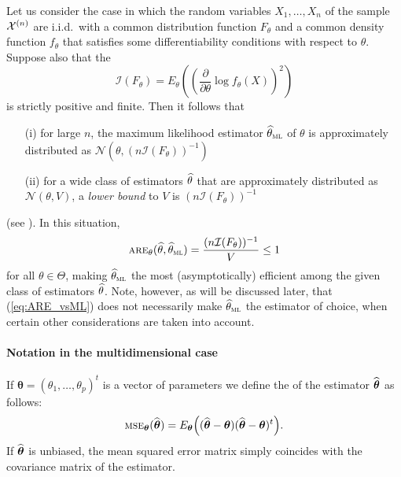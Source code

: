 Let us consider the case in which the random variables
$X_1, \ldots, X_n$ of the sample ${\cal X}^{(n)}$ are i.i.d.\ with a common
distribution function $F_{\theta}$ and a common density function $f_{\theta}$
that satisfies some differentiability conditions with respect to $\theta$.
Suppose also that the \emph{}
\[
    \mathcal{I}\left(F_{\theta}\right) =
        E_{\theta}\left(\left(\frac{\partial}{\partial\theta}
        \log f_{\theta}(X)\right)^2\right)
\] 
is strictly positive and finite. Then it follows that
\begin{enumerate}
    \item[(i)] for large $n$, the maximum likelihood estimator
    $\sthat{\theta}_{\stsc{ML}}$ of $\theta$ is approximately distributed as
    $\mathcal{N}\left(\theta, (n \mathcal{I}(F_{\theta}))^{-1}\right)$
    
    \item[(ii)] for a wide class of estimators $\widehat{\theta}$ that are
    approximately distributed as $\mathcal{N}(\theta, V)$, a \emph{lower
    bound} to $V$ is $(n \mathcal{I}(F_{\theta}))^{-1}$
\end{enumerate}
(see \citealp{LehmannCasella1988}). In this situation,
%
\begin{equation}\label{eq:ARE_vsML}
    \stsc{ARE}_{\theta}(\sthat{\theta}, \sthat{\theta}_{\stsc{ML}})
     = \frac{(n \mathcal{I}(F_{\theta}))^{-1}}{V} \leq 1
\end{equation}
%
for all $\theta \in \Theta$, making $\sthat{\theta}_{\stsc{ML}}$ the most (asymptotically) efficient among
the given class of estimators $\widehat{\theta}$. Note, however, as will be
discussed later, that (\ref{eq:ARE_vsML}) does not necessarily make
$\sthat{\theta}_{\stsc{ML}}$ the estimator of choice, when certain other
considerations are taken into account.


\paragraph{Notation in the multidimensional case}

If $\boldsymbol\theta = (\theta_1, \dots, \theta_p)^t$ is a vector of parameters
we define the \emph{}
of the estimator $\widehat{\boldsymbol\theta}$ as follows:
\[
    \stsc{MSE}_{\boldsymbol\theta}(\sthat{\boldsymbol\theta})
    = E_{\boldsymbol\theta}\left((\sthat{\boldsymbol\theta} - \boldsymbol\theta)
                                 (\sthat{\boldsymbol\theta} - \boldsymbol\theta)^t
                           \right).
\]
If $\widehat{\boldsymbol\theta}$ is unbiased, the mean squared error matrix simply
coincides with the covariance matrix of the estimator.


